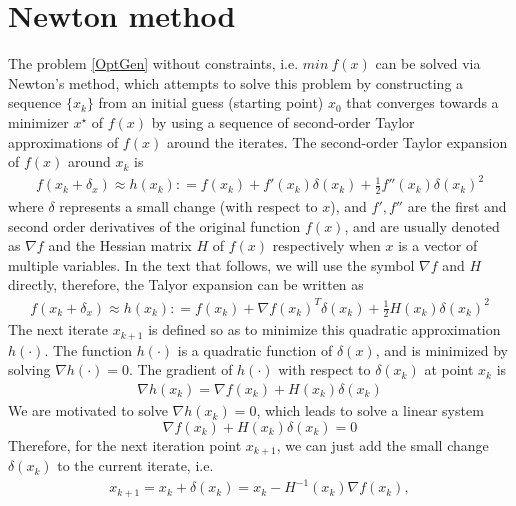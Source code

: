\section{Newton method}
The problem \ref{OptGen} without constraints, i.e. $min \  f(x)$  can be solved via Newton's method, which attempts to solve this problem by constructing a sequence $\{x_k\}$ from an initial guess (starting point) $x_0$ that converges towards a minimizer $x^\star$ of $f(x)$  by using a sequence of second-order Taylor approximations of $f(x)$ around the iterates. The second-order Taylor expansion of $f(x)$ around $x_k$ is
\begin{align*}
f(x_k + \delta_x) \approx h(x_k) : = f(x_k) + f'(x_k)\delta(x_k) +\frac{1}{2}f''(x_k)\delta(x_k)^2 
\end{align*}
where $\delta$ represents a small change (with respect to $x$), and $f', f''$ are the first and second order derivatives of the original function $f(x)$, and are usually denoted as $\nabla f$ and the Hessian matrix $H$ of $f(x)$ respectively when $x$ is a vector of multiple variables. In the text that follows, we will use the symbol $\nabla f$ and $H$ directly, therefore, the Talyor expansion can be written as 
\begin{align*}
	f(x_k + \delta_x) \approx h(x_k) : = f(x_k) + \nabla f(x_k)^T\delta(x_k) +\frac{1}{2}H(x_k)\delta(x_k)^2 
\end{align*}
 The next iterate $x_{k+1}$ is defined so as to minimize this quadratic approximation $h(\cdot)$. The function $h(\cdot)$ is a quadratic function of $\delta(x)$, and is minimized by solving $\nabla h(\cdot) = 0$. The gradient of $h(\cdot)$ with respect to $\delta(x_k)$ at point $x_k$ is
\begin{align*}
\nabla h(x_k) = \nabla f(x_k) + H(x_k) \delta(x_k) 
\end{align*}
We are motivated to solve $\nabla h(x_k) =0$, which leads to solve a linear system
\begin{equation}
\nabla f(x_k) + H(x_k) \delta(x_k) =0
	\label{HessianEq}
\end{equation}
Therefore, for the next iteration point $x_{k+1}$, we can just add the small change $\delta(x_k)$ to the current iterate, i.e. 
\begin{align*}
	x_{k+1}  = x_k + \delta(x_k) = x_k - H^{-1}(x_k)\nabla f(x_k), 
\end{align*}
